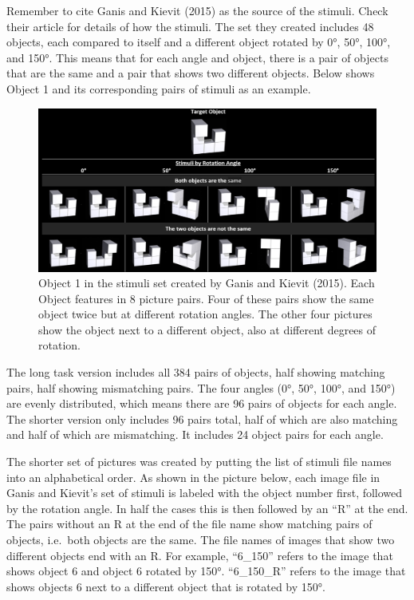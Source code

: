 \documentclass[
]{book}
\begin{document}
Remember to cite Ganis and Kievit (2015) as the source of the stimuli. Check their article for details of how the stimuli.
The set they created includes 48 objects, each compared to itself and a different object rotated by 0°, 50°, 100°, and 150°. This means that for each angle and object, there is a pair of objects that are the same and a pair that shows two different objects. Below shows Object 1 and its corresponding pairs of stimuli as an example.

\begin{figure}

{\centering \includegraphics[width=0.99\linewidth]{images/RotationOverview} 

}

\caption{Object 1 in the stimuli set created by Ganis and Kievit (2015). Each Object features in 8 picture pairs. Four of these pairs show the same object twice but at different rotation angles. The other four pictures show the object next to a different object, also at different degrees of rotation.}\label{fig:Figure5-2}
\end{figure}

The long task version includes all 384 pairs of objects, half showing matching pairs, half showing mismatching pairs. The four angles (0°, 50°, 100°, and 150°) are evenly distributed, which means there are 96 pairs of objects for each angle. The shorter version only includes 96 pairs total, half of which are also matching and half of which are mismatching. It includes 24 object pairs for each angle.

The shorter set of pictures was created by putting the list of stimuli file names into an alphabetical order. As shown in the picture below, each image file in Ganis and Kievit's set of stimuli is labeled with the object number first, followed by the rotation angle. In half the cases this is then followed by an ``R'' at the end. The pairs without an R at the end of the file name show matching pairs of objects, i.e.~both objects are the same. The file names of images that show two different objects end with an R. For example, ``6\_150'' refers to the image that shows object 6 and object 6 rotated by 150°. ``6\_150\_R'' refers to the image that shows objects 6 next to a different object that is rotated by 150°.
\end{document}
